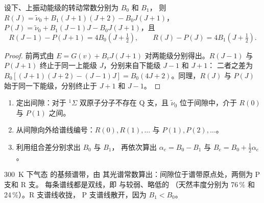 \begin{theorem}[组合差分]\label{thm:b3:rovibrational-spectroscopy:combination-differences}
设下、上振动能级的转动常数分别为 $B_0$ 和 $B_1$，
则 $R(J) = \tilde\nu_0 + B_1(J+1)(J+2) - B_0J(J+1)$，$P(J) = \tilde\nu_0 +
B_1(J-1)J - B_0J(J+1)$，且
\[
R(J - 1) - P(J + 1) = 4B_0(J + \tfrac12), \qquad R(J) - P(J) = 4B_1(J + \tfrac12).
\]
\end{theorem}

\begin{proof}
前两式由 $E = G(v) + B_vJ(J+1)$ 对两能级分别得出。$R(J - 1)$ 与
$P(J + 1)$ 终止于同一上能级 $J$，分别来自下能级 $J - 1$ 和 $J + 1$：
二者之差为 $B_0[(J+1)(J+2) - (J-1)J] = B_0(4J + 2)$。同理，$R(J)$ 与
$P(J)$ 始于同一下能级，分别终止于 $J + 1$ 和 $J - 1$。
\end{proof}

\begin{method}[分析振转谱带]\label{met:b3:rovibrational-spectroscopy:combination}
\begin{enumerate}
  \item 定出间隙：对于 ${}^1\Sigma$ 双原子分子不存在 Q 支，且
        $\tilde\nu_0$ 位于间隙中，介于 $R(0)$ 与 $P(1)$ 之间。
  \item 从间隙向外给谱线编号：$R(0), R(1), \dots$ 与 $P(1),
        P(2), \dots$。
  \item 利用组合差分别求出 $B_0$ 与 $B_1$，
        再依次算出 $\alpha_e = B_0 - B_1$ 与 $B_e = B_0 + \frac12\alpha_e$。
\end{enumerate}
\end{method}

\begin{omfigure}

{\small \qty{300}{K} 下气态  的基频谱带，由
其光谱常数算出：间隙位于谱带原点处，两侧为 P 支和 R 支。
每条谱线都是双线，即  与较弱、略低的
（天然丰度分别为 76\,\% 和 24\,\%）。R 支谱线收拢，
P 支谱线散开，因为 $B_1 < B_0$。}
\end{omfigure}

